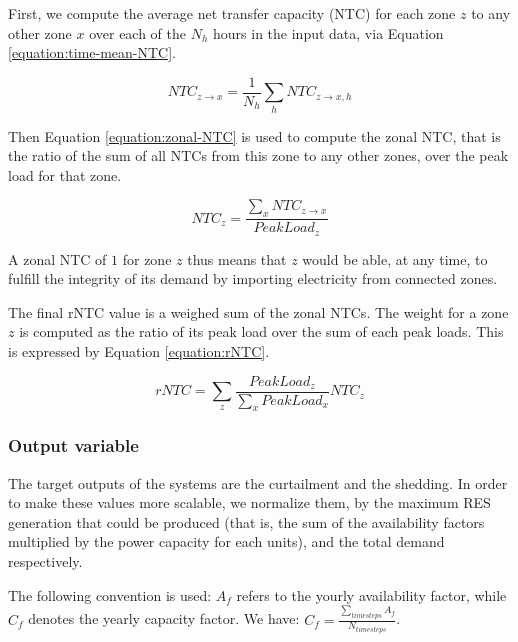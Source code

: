 \begin{enumerate}
    First, we compute the average net transfer capacity (NTC) for each zone $z$ to any other zone $x$ over each of the $N_h$ hours in the input data, via Equation \ref{equation:time-mean-NTC}.

    \begin{equation}
        NTC_{z\rightarrow x} = \frac{1}{N_h} \sum_h NTC_{z\rightarrow x,h}
        \label{equation:time-mean-NTC}
    \end{equation}

    Then Equation \ref{equation:zonal-NTC} is used to compute the zonal NTC, that is the ratio of the sum of all NTCs from this zone to any other zones, over the peak load for that zone.

    \begin{equation}
        NTC_z = \frac{\sum_x NTC_{z\rightarrow x}}{PeakLoad_z}
        \label{equation:zonal-NTC}
    \end{equation}

    A zonal NTC of $1$ for zone $z$ thus means that $z$ would be able, at any time, to fulfill the integrity of its demand by importing electricity from connected zones.

    The final rNTC value is a weighed sum of the zonal NTCs. The weight for a zone $z$ is computed as the ratio of its peak load over the sum of each peak loads. This is expressed by Equation \ref{equation:rNTC}.

    \begin{equation}
        rNTC = \sum_z \frac{PeakLoad_z}{\sum_x PeakLoad_x} NTC_z
        \label{equation:rNTC}
    \end{equation}
\end{enumerate}

\subsubsection{Output variable}

The target outputs of the systems are the curtailment and the shedding. In order to make these values more scalable, we normalize them, by the maximum RES generation that could be produced (that is, the sum of the availability factors multiplied by the power capacity for each units), and the total demand respectively.

The following convention is used: $A_f$ refers to the yourly availability factor, while $C_f$ denotes the yearly capacity factor. We have: $C_f = \frac{\sum_{timesteps} A_f }{N_{timesteps}}$.

